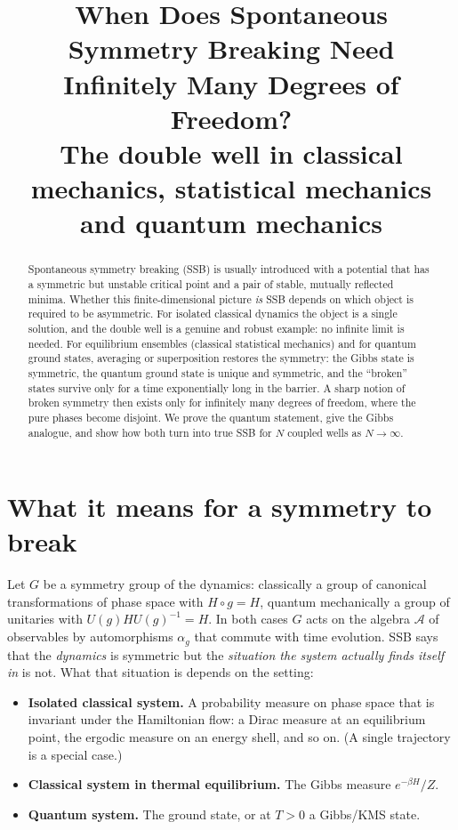 \documentclass[11pt,a4paper]{article}
\title{When Does Spontaneous Symmetry Breaking Need\\ Infinitely Many Degrees of Freedom?\\[4pt]
\large The double well in classical mechanics, statistical mechanics and quantum mechanics}
\author{}
\date{}
\theoremstyle{definition}
\theoremstyle{remark}
\begin{document}
\maketitle

\begin{abstract}
\noindent
Spontaneous symmetry breaking (SSB) is usually introduced with a potential that has a symmetric but unstable
critical point and a pair of stable, mutually reflected minima. Whether this finite-dimensional picture
\emph{is} SSB depends on which object is required to be asymmetric. For isolated classical dynamics the object
is a single solution, and the double well is a genuine and robust example: no infinite limit is needed. For
equilibrium ensembles (classical statistical mechanics) and for quantum ground states, averaging or
superposition restores the symmetry: the Gibbs state is symmetric, the quantum ground state is unique and
symmetric, and the ``broken'' states survive only for a time exponentially long in the barrier. A sharp notion
of broken symmetry then exists only for infinitely many degrees of freedom, where the pure phases become
disjoint. We prove the quantum statement, give the Gibbs analogue, and show how both turn into true SSB for
$N$ coupled wells as $N\to\infty$.
\end{abstract}

\section{What it means for a symmetry to break}\label{sec:def}

Let $G$ be a symmetry group of the dynamics: classically a group of canonical transformations of phase space
with $H\circ g=H$, quantum mechanically a group of unitaries with $U(g)HU(g)^{-1}=H$. In both cases $G$ acts on the
algebra $\mathcal A$ of observables by automorphisms $\alpha_g$ that commute with time evolution. SSB says that
the \emph{dynamics} is symmetric but the \emph{situation the system actually finds itself in} is not. What that
situation is depends on the setting:

\begin{itemize}
\item[(A)] \textbf{Isolated classical system.} A probability measure on phase space that is invariant under the
Hamiltonian flow: a Dirac measure at an equilibrium point, the ergodic measure on an energy shell, and so on.
(A single trajectory is a special case.)
\item[(B)] \textbf{Classical system in thermal equilibrium.} The Gibbs measure $e^{-\beta H}/Z$.
\item[(C)] \textbf{Quantum system.} The ground state, or at $T>0$ a Gibbs/KMS state.
\end{itemize}
\end{document}
